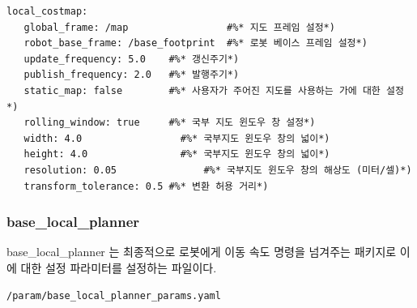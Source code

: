 \vspace{\baselineskip}
\begin{lstlisting}[language=ROS]
local_costmap:
   global_frame: /map                 #%* 지도 프레임 설정*)
   robot_base_frame: /base_footprint  #%* 로봇 베이스 프레임 설정*)
   update_frequency: 5.0    #%* 갱신주기*)
   publish_frequency: 2.0   #%* 발행주기*)
   static_map: false        #%* 사용자가 주어진 지도를 사용하는 가에 대한 설정*)
   rolling_window: true     #%* 국부 지도 윈도우 창 설정*)
   width: 4.0                 #%* 국부지도 윈도우 창의 넓이*)
   height: 4.0                #%* 국부지도 윈도우 창의 넓이*)
   resolution: 0.05               #%* 국부지도 윈도우 창의 해상도 (미터/셀)*)
   transform_tolerance: 0.5 #%* 변환 허용 거리*)
\end{lstlisting}

\subsubsection{base\_local\_planner}
base\_local\_planner 는 최종적으로 로봇에게 이동 속도 명령을 넘겨주는 패키지로 이에 대한 설정 파라미터를 설정하는 파일이다.

\vspace{\baselineskip}
\begin{lstlisting}[language=ROS]
/param/base_local_planner_params.yaml
\end{lstlisting}

